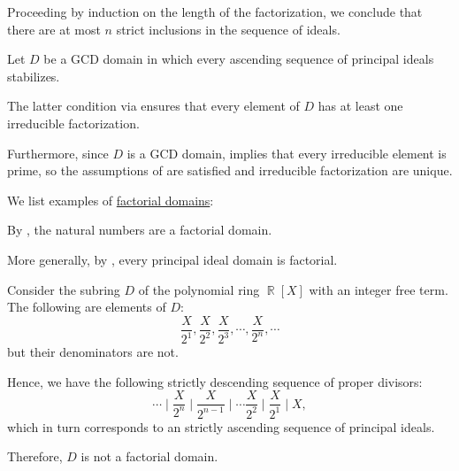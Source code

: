 \begin{defproof}
  Proceeding by induction on the length of the factorization, we conclude that there are at most \( n \) strict inclusions in the sequence of ideals.

   Let \( D \) be a GCD domain in which every ascending sequence of principal ideals stabilizes.

  The latter condition via  ensures that every element of \( D \) has at least one irreducible factorization.

  Furthermore, since \( D \) is a GCD domain,  implies that every irreducible element is prime, so the assumptions of  are satisfied and irreducible factorization are unique.
\end{defproof}

\begin{example}\label{ex:def:factorial_domain}
  We list examples of \hyperref[def:factorial_domain]{factorial domains}:
  \begin{thmenum}
     By , the natural numbers are a factorial domain.

     More generally, by , every principal ideal domain is factorial.

     Consider the subring \( D \) of the polynomial ring \( \BbbR[X] \) with an integer free term. The following are elements of \( D \):
    \begin{equation*}
      \frac X {2^1}, \frac X {2^2}, \frac X {2^3}, \cdots, \frac X {2^n}, \cdots
    \end{equation*}
    but their denominators are not.

    Hence, we have the following strictly descending sequence of proper divisors:
    \begin{equation*}
      \cdots \mid \frac X {2^n} \mid \frac X {2^{n-1}} \mid \cdots \frac X {2^2} \mid \frac X {2^1} \mid X,
    \end{equation*}
    which in turn corresponds to an strictly ascending sequence of principal ideals.

    Therefore, \( D \) is not a factorial domain.
  \end{thmenum}
\end{example}

